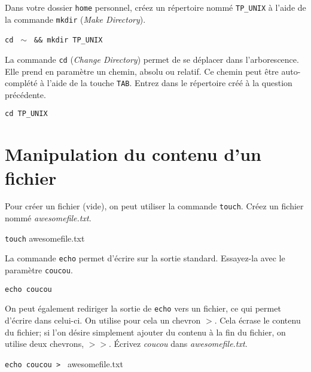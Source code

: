 \documentclass{scrartcl}
\newcommand{\tutoFileName}{awesomefile.txt}
\begin{document}
\begin{question}[name=Q.]
	Dans votre dossier \lstinline|home| personnel, créez un répertoire nommé \lstinline|TP_UNIX| à l'aide de la commande \lstinline|mkdir| (\emph{Make Directory}).
\end{question}
\begin{solution}
	\lstinline|cd | $\sim$ \lstinline| && mkdir TP_UNIX|
\end{solution}

\begin{question}[name=Q.]
	La commande \lstinline|cd| (\emph{Change Directory}) permet de se déplacer dans l'arborescence. Elle prend en paramètre un chemin, absolu ou relatif. Ce chemin peut être auto-complété à l'aide de la touche \lstinline|TAB|. Entrez dans le répertoire créé à la question précédente.
\end{question}
\begin{solution}
	\lstinline|cd TP_UNIX|
	\clearpage
\end{solution}

\section{Manipulation du contenu d'un fichier}

\begin{question}[name=Q.]
	Pour créer un fichier (vide), on peut utiliser la commande \lstinline|touch|. Créez un fichier nommé \emph{\tutoFileName}.
\end{question}
\begin{solution}
	\lstinline|touch| \tutoFileName %
\end{solution}

\begin{question}[name=Q.]
	La commande \lstinline|echo| permet d'écrire sur la sortie standard. Essayez-la avec le paramètre \lstinline|coucou|.
\end{question}
\begin{solution}
	\lstinline|echo coucou|
\end{solution}

\begin{question}[name=Q.]
	On peut également rediriger la sortie de \lstinline|echo| vers un fichier, ce qui permet d'écrire dans celui-ci. On utilise pour cela un chevron $>$. Cela écrase le contenu du fichier; si l'on désire simplement ajouter du contenu à la fin du fichier, on utilise deux chevrons, $>>$. Écrivez \emph{coucou} dans \emph{\tutoFileName}.
\end{question}
\begin{solution}
	\lstinline|echo coucou > | \tutoFileName
\end{solution}
\end{document}
